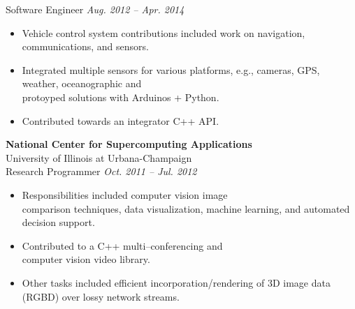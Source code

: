 \documentclass{article}
\begin{document}
{\begin{multicols}{2}
                \vspace{10px}
                Software Engineer \hfill \textsl{Aug. 2012 -- Apr. 2014}\\
                \vspace{ -10px}
                \begin{itemize}[noitemsep,nolistsep]
                    \item Vehicle control system contributions included work on navigation, communications, and sensors.
                    \item Integrated multiple sensors for various platforms, e.g., cameras, GPS, weather, oceanographic and \\protoyped solutions with Arduinos + Python.
                    \item Contributed towards an integrator C++ API.
                \end{itemize}
                \vspace{10px}
                \textbf{National Center for Supercomputing Applications}\\
                University of Illinois at Urbana-Champaign\\
                Research Programmer \hfill \textsl{Oct. 2011 -- Jul. 2012}\\
                \vspace{ -10px}
                \begin{itemize}[noitemsep,nolistsep]
                    \item Responsibilities included computer vision image \\comparison techniques, data visualization, machine learning, and automated decision support. 
                    \item Contributed to a C++ multi--conferencing and \\computer vision video library.  
                    \item Other tasks included efficient incorporation/rendering of 3D image data (RGBD) over lossy network streams.  
                \end{itemize}
                \vspace{10px}

\end{multicols}}
\end{document}
